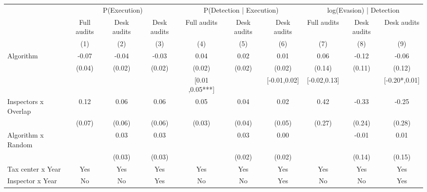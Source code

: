 \begin{tabular}{lccc|ccc|ccc} \toprule
\multicolumn{1}{l}{} & \multicolumn{3}{c}{P(Execution)} & \multicolumn{3}{c}{P(Detection | Execution)} & \multicolumn{3}{c}{log(Evasion) | Detection} \\\cmidrule(lr){2-4}\cmidrule(lr){5-7}\cmidrule(lr){8-10} \multicolumn{1}{l}{} & Full audits & Desk audits & Desk audits & Full audits & Desk audits & Desk audits & Full audits & Desk audits & Desk audits \\ \multicolumn{1}{l}{} & (1) & (2) & (3) & (4) & (5) & (6) & (7) & (8) & (9) \\ \midrule
Algorithm   &       -0.07\sym{*}  &       -0.04         &       -0.03         &        0.04\sym{**} &        0.02         &        0.01         &        0.06         &       -0.12         &       -0.06         \\
            &      (0.04)         &      (0.02)         &      (0.02)         &      (0.02)         &      (0.02)         &      (0.02)         &      (0.14)         &      (0.11)         &      (0.12)         \\
\addlinespace
 & & & & [0.01 ,0.05***] & & [-0.01,0.02] & [-0.02,0.13] & & [-0.20*,0.01] \\  Inspectors x Overlap&        0.12\sym{*}  &        0.06         &        0.06         &        0.05         &        0.04         &        0.02         &        0.42         &       -0.33         &       -0.25         \\
            &      (0.07)         &      (0.06)         &      (0.06)         &      (0.03)         &      (0.04)         &      (0.05)         &      (0.27)         &      (0.24)         &      (0.28)         \\
\addlinespace
Algorithm x Random&                     &        0.03         &        0.03         &                     &        0.03         &        0.00         &                     &       -0.01         &        0.01         \\
            &                     &      (0.03)         &      (0.03)         &                     &      (0.02)         &      (0.02)         &                     &      (0.14)         &      (0.15)         \\
\midrule
Tax center x Year&         Yes         &         Yes         &         Yes         &         Yes         &         Yes         &         Yes         &         Yes         &         Yes         &         Yes         \\
Inspector x Year&          No         &          No         &         Yes         &          No         &          No         &         Yes         &          No         &          No         &         Yes         \\

\end{tabular}
